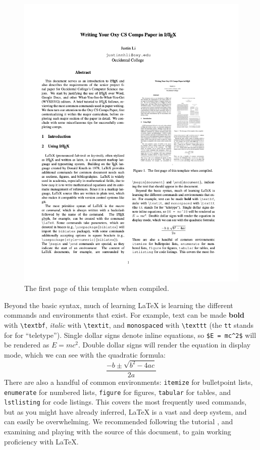 \documentclass[12pt,twocolumn]{article}
\begin{document}
\begin{figure}
    \centering
    \includegraphics[width=.95\linewidth]{first-page.png}
    \caption{
        The first page of this template when compiled.
    }
    \label{structures}
\end{figure}

Beyond the basic syntax, much of learning LaTeX is learning the different commands and environments that exist.
For example, text can be made \textbf{bold} with \texttt{\textbackslash textbf}, \textit{italic} with \texttt{\textbackslash textit}, and \texttt{monospaced} with \texttt{\textbackslash texttt} (the \texttt{tt} stands for for ``teletype'').
Single dollar signs denote inline equations, so \texttt{\$E = mc\textasciicircum 2\$} will be rendered as $E = mc^2$.
Double dollar signs will render the equation in display mode, which we can see with the quadratic formula:
$$\frac{{-b \pm \sqrt {b^2 - 4ac} }}{{2a}}$$
There are also a handful of common environments: \texttt{itemize} for bulletpoint lists, \texttt{enumerate} for numbered lists, \texttt{figure} for figures, \texttt{tabular} for tables, and \texttt{lstlisting} for code listings.
This covers the most frequently used commands, but as you might have already inferred, LaTeX is a vast and deep system, and can easily be overwhelming.
We recommended following the  tutorial \cite{Overleaf2021LearnLaTeXIn}, and examining and playing with the source of this document, to gain working proficiency with LaTeX.
\end{document}
